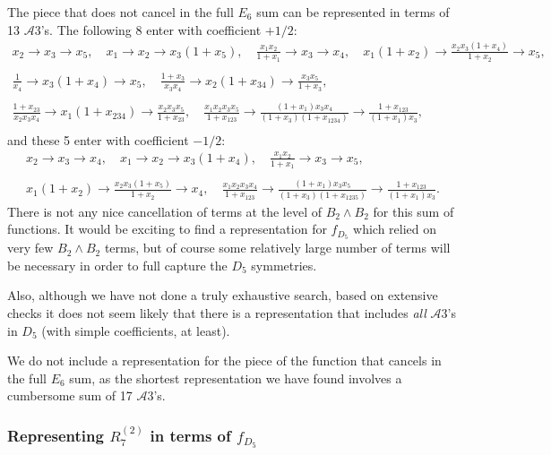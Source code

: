 \documentclass[11pt]{article}
\def\a{\mathcal{A}}
\def\fd5{f_{D_5}}
\def\bb2{B_2\wedge B_2}
\begin{document}
The piece that does not cancel in the full $E_6$ sum can be represented in terms of 13 $\a3$'s. The following 8 enter with coefficient $+1/2$:
\begin{gather*}
	x_2\to x_3\to x_5,\quad x_1\to x_2\to x_3 \left(1+x_5\right),\quad \frac{x_1 x_2}{1+x_1}\to x_3\to x_4,\quad x_1\left(1+x_2\right)\to \frac{x_2 x_3\left(1+x_4\right)}{1+x_2}\to x_5,\\ \\
	\frac{1}{x_4}\to x_3 \left(1+x_4\right)\to x_5,\quad \frac{1+x_3}{x_3x_4}\to x_2 (1+x_{34})\to \frac{x_3x_5}{1+x_3},\\ \\
	\frac{1+x_{23}}{x_2 x_3 x_4}\to x_1(1+x_{234})\to \frac{x_2x_3 x_5}{1+x_{23}},\quad
	\frac{x_1 x_2 x_3x_5}{1+x_{123}}\to\frac{\left(1+x_1\right) x_3 x_4}{\left(1+x_3\right)\left(1+x_{1234}\right)}\to \frac{1+x_{123}}{\left(1+x_1\right) x_3},\\
\end{gather*}
and these 5 enter with coefficient $-1/2$:
\begin{gather*}
	x_2\to x_3\to x_4,\quad x_1\to x_2\to x_3 \left(1+x_4\right),\quad \frac{x_1 x_2}{1+x_1}\to x_3\to x_5,\\ \\ x_1\left(1+x_2\right)\to \frac{x_2 x_3\left(1+x_5\right)}{1+x_2}\to x_4,\quad
	\frac{x_1 x_2 x_3x_4}{1+x_{123}}\to\frac{\left(1+x_1\right) x_3 x_5}{\left(1+x_3\right)\left(1+x_{1235}\right)}\to \frac{1+x_{123}}{\left(1+x_1\right) x_3}.
\end{gather*}
There is not any nice cancellation of terms at the level of $\bb2$ for this sum of functions. It would be exciting to find a representation for $\fd5$ which relied on very few $\bb2$ terms, but of course some relatively large number of terms will be necessary in order to full capture the $D_5$ symmetries. 

Also, although we have not done a truly exhaustive search, based on extensive checks it does not seem likely that there is a representation that includes \emph{all} $\a3$'s in $D_5$ (with simple coefficients, at least).

We do not include a representation for the piece of the function that cancels in the full $E_6$ sum, as the shortest representation we have found involves a cumbersome sum of 17 $\a3$'s. 

\subsubsection*{Representing $R^{(2)}_7$ in terms of $\fd5$}
\end{document}
